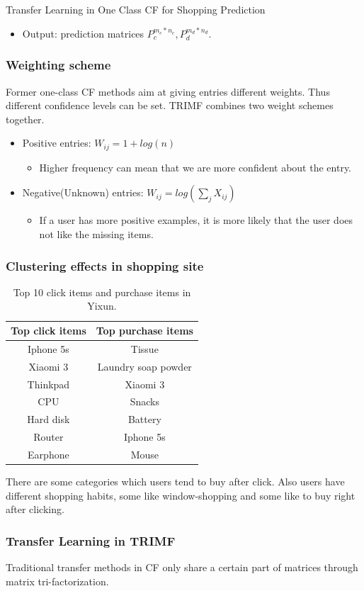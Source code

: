 \documentclass[xetex,mathserif,serif]{beamer}
\begin{document}
\begin{section}{Transfer Learning in One Class CF for Shopping Prediction}
\begin{frame}
\begin{itemize}
      $m_c,m_d$ are the number of users in each matrix while $n_c,n_d$ denote the number of items.
    \item Output: prediction matrices $P_c^{m_c*n_c}, P_d^{m_d*n_d}$.
    \end{itemize}
  \end{frame}
  \begin{frame}
    \frametitle{Weighting scheme}
    Former one-class CF methods aim at giving entries different weights. Thus different confidence levels can be set. TRIMF combines two weight schemes together.
    \begin{itemize}
    \item Positive entries: $W_{ij} = 1 + log(n)$
      \begin{itemize}
      \item Higher frequency can mean that we are more confident about the entry.
      \end{itemize}
    \item Negative(Unknown) entries: $W_{ij} = log(\sum_j X_{ij})$
      \begin{itemize}
      \item If a user has more positive examples, it is more
        likely that the user does not like the missing items.
      \end{itemize}
    \end{itemize}
  \end{frame}
  \begin{frame}
    \frametitle{Clustering effects in shopping site}
    \begin{table}[h]
      \begin{center}
        \begin{tabular}{| c | c |}
          \hline
          Top click items & Top purchase items \\
          \hline
          Iphone 5s & Tissue\\
          Xiaomi 3 & Laundry soap powder\\
          Thinkpad & Xiaomi 3\\
          CPU & Snacks\\
          Hard disk & Battery\\
          Router & Iphone 5s\\
          Earphone & Mouse\\
          \hline
        \end{tabular}
        \caption{Top 10 click items and purchase items in Yixun.}
      \end{center}
    \end{table}
    There are some categories which users tend to buy after click. Also users have different shopping habits, some like window-shopping and some like to buy right after clicking.
  \end{frame}
  \begin{frame}
    \frametitle{Transfer Learning in TRIMF}
    Traditional transfer methods in CF only share a certain part of matrices through \alert{matrix tri-factorization}.


\end{frame}
\end{section}
\end{document}
